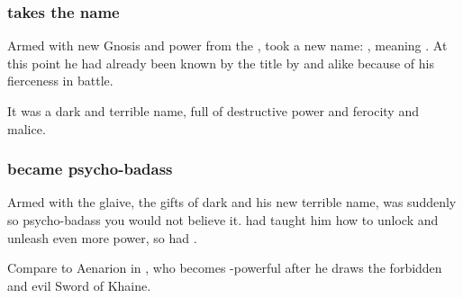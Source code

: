 \subsubsection{\Ishnaruchaefir takes the name \Nierzshah}
Armed with new Gnosis and power from the \xss, \Ishnaruchaefir took a new name:
\quo{\Nierzshah}, meaning .
At this point he had already been known by the title  by \resphain and \dragons alike because of his fierceness in battle. 

It was a dark and terrible name, full of destructive power and ferocity and malice. 






\subsubsection{\Ishnaruchaefir became psycho-badass}
Armed with the glaive, the gifts of dark \NerrhanKoss and his new terrible name, \Ishnaruchaefir{} was suddenly so psycho-badass you would not believe it. 
\NerrhanKoss{} had taught him how to unlock and unleash even more \xsic{} \shaeeroth{} power, so \Ishnaruchaefir{} had . 

Compare to Aenarion in \cite{RPG:Warhammer:HighElves}, who becomes \uber-powerful after he draws the forbidden and evil Sword of Khaine. 

